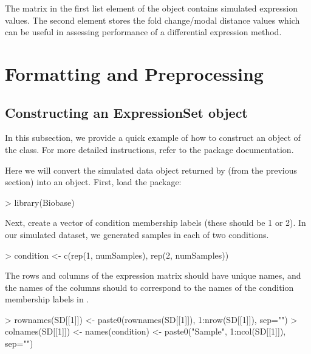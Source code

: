 \documentclass{article}
\begin{document}
The matrix in the first list element of the  object contains simulated expression values.  The second element stores the fold change/modal distance values which can be useful in assessing performance of a differential expression method.

\section{Formatting and Preprocessing}
\subsection{Constructing an ExpressionSet object}

In this subsection, we provide a quick example of how to construct an object of the  class.  For more detailed instructions, refer to the  package documentation.

Here we will convert the simulated data object  returned by  (from the previous section) into an  object. First, load the  package:

\begin{Schunk}
\begin{Sinput}
> library(Biobase)   
\end{Sinput}
\end{Schunk}

Next, create a vector of condition membership labels (these should be 1 or 2).  In our simulated dataset, we generated  samples in each of two conditions.

\begin{Schunk}
\begin{Sinput}
> condition <- c(rep(1, numSamples), rep(2, numSamples))
\end{Sinput}
\end{Schunk}

The rows and columns of the expression matrix should have unique names, and the names of the columns should to correspond to the names of the condition membership labels in .

\begin{Schunk}
\begin{Sinput}
> rownames(SD[[1]]) <- paste0(rownames(SD[[1]]), 1:nrow(SD[[1]]), sep="")
> colnames(SD[[1]]) <- names(condition) <- paste0("Sample", 1:ncol(SD[[1]]), sep="")
\end{Sinput}
\end{Schunk}
\end{document}
